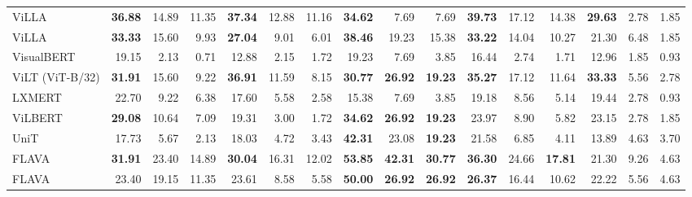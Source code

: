 \documentclass[10pt,twocolumn,letterpaper]{article}
\begin{document}
\begin{table*}[!ht]
{\begin{tabular}{lrrr|rrr|rrr|rrr|rrr}
 ViLLA              & \textbf{36.88} & 14.89          & 11.35          & \textbf{37.34} & 12.88          & 11.16          & \textbf{34.62} & 7.69           & 7.69           & \textbf{39.73} & 17.12          & 14.38          & \textbf{29.63} & 2.78           & 1.85           \\
 ViLLA               & \textbf{33.33} & 15.60          & 9.93           & \textbf{27.04} & 9.01           & 6.01           & \textbf{38.46} & 19.23          & 15.38          & \textbf{33.22} & 14.04          & 10.27          & 21.30          & 6.48           & 1.85           \\
 VisualBERT          & 19.15          & 2.13           & 0.71           & 12.88          & 2.15           & 1.72           & 19.23          & 7.69           & 3.85           & 16.44          & 2.74           & 1.71           & 12.96          & 1.85           & 0.93           \\
 ViLT (ViT-B/32)              & \textbf{31.91} & 15.60          & 9.22           & \textbf{36.91} & 11.59          & 8.15           & \textbf{30.77} & \textbf{26.92} & \textbf{19.23} & \textbf{35.27} & 17.12          & 11.64          & \textbf{33.33} & 5.56           & 2.78           \\
 LXMERT                       & 22.70          & 9.22           & 6.38           & 17.60          & 5.58           & 2.58           & 15.38          & 7.69           & 3.85           & 19.18          & 8.56           & 5.14           & 19.44          & 2.78           & 0.93           \\
 ViLBERT             & \textbf{29.08} & 10.64          & 7.09           & 19.31          & 3.00           & 1.72           & \textbf{34.62} & \textbf{26.92} & \textbf{19.23} & 23.97          & 8.90           & 5.82           & 23.15          & 2.78           & 1.85           \\
 UniT       & 17.73          & 5.67           & 2.13           & 18.03          & 4.72           & 3.43           & \textbf{42.31} & 23.08          & \textbf{19.23} & 21.58          & 6.85           & 4.11           & 13.89          & 4.63           & 3.70           \\
  FLAVA                & \textbf{31.91} & 23.40 & 14.89 & \textbf{30.04} & 16.31 & 12.02 & \textbf{53.85} & \textbf{42.31} & \textbf{30.77} & \textbf{36.30} & 24.66 & \textbf{17.81} & 21.30          & 9.26 & 4.63 \\
 FLAVA        & 23.40          & 19.15 & 11.35 & 23.61          &  8.58 &  5.58 & \textbf{50.00} & \textbf{26.92} & \textbf{26.92} & \textbf{26.37} & 16.44 & 10.62          & 22.22          &  5.56 & 4.63 \\

\end{tabular}}
\end{table*}
\end{document}

